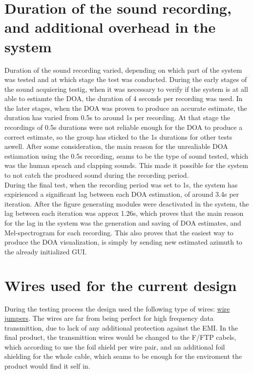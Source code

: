 \section{Duration of the sound recording, and additional overhead in the system}
Duration of the sound recording varied, depending on which part of the system was tested and at which stage the test was conducted. During the early stages of the sound acquiering testig, when it was necessary to verify if the system is at all able to estiamte the DOA, the duration of 4 seconds per recording was used. In the later stages, when the DOA was proven to produce an accurate estimate, the duration has varied from 0.5s to around 1s per recording. At that stage the recordings of 0.5s durations were not reliable enough for the DOA to produce a correct estimate, so the group has sticked to the 1s durations for other tests aswell. After some consideration, the main reason for the unrealiable DOA estiamation using the 0.5s recording, seams to be the type of sound tested, which was the human speach and clapping sounds. This made it possible for the system to not catch the produced sound during the recording period.\\
\newpage
During the final test, when the recording period was set to 1s, the system has expirienced a significant lag between each DOA estimation, of around 3.4s per iteration. After the figure generating modules were deactivated in the system, the lag between each iteration was approx 1.26s, which proves that the main reason for the lag in the system was the generation and saving of DOA estimates, and Mel-spectrogram for each recording. This also proves that the easiest way to produce the DOA visualization, is simply by sending new estimated azimuth to the already initialized GUI.\\

\section{Wires used for the current design}
During the testing process the design used the following type of wires: \href{https://no.rs-online.com/web/p/breadboard-jumper-wires/7916454?cm_mmc=NO-PLA-DS3A-_-google-_-CSS_NO_EN_Pmax_Test-_--_-7916454&matchtype=&&gclsrc=aw.ds&gad_source=1&gad_campaignid=20298225819&gbraid=0AAAAADkeWNNR65FpdoBu5Vw5TPO3sZJXO&gclid=CjwKCAjw8arQBhB9EiwAfIKdQmniRsQJ3BquaxlQT0Hdzn6rzL6tpD5bGd_lQR6NpS9tRgIWoZC9VxoCEAQQAvD_BwE}{wire jumpers}. The wires are far from being perfect for high frequency data transmittion, due to lack of any additional protection against the EMI. In the final product, the transmittion wires would be changed to the F/FTP cabels, which according to \cite{linkpp_stp_cable_2025} use the foil shield per wire pair, and an additional foil shielding for the whole cable, which seams to be enough for the enviroment the product would find it self in.\\

